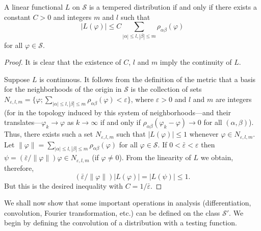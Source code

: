 \begin{theorem}\label{thm:c1-3-11}
A linear functional $L$ on $\mathscr{S}$ is a tempered distribution if and
only if there exists a constant $C > 0$ and integers $m$ and $l$ such that
\[
\left|L(\varphi)\right|\leq C\sum_{|\alpha|\leq l,|\beta|\leq m}\rho_{\alpha\beta}(\varphi)
\]
for all $\varphi \in \mathscr{S}$.
\end{theorem}

\begin{proof}
It is clear that the existence of $C$, $l$ and $m$ imply the continuity of $L$.

Suppose $L$ is continuous. It follows from the definition of the metric that a
basis for the neighborhoods of the origin in $\mathscr{S}$ is the collection
of sets
$N_{\varepsilon,l,m}=\{\varphi; \sum_{|\alpha|\leq l,|\beta|\leq m} \rho_{\alpha\beta}(\varphi) < \varepsilon\}$,
where $\varepsilon > 0$ and $l$ and $m$ are integers (for in the topology
induced by this system of neighborhoods---and their translates---$\varphi_{k} \to \varphi$
as $k \to \infty$ if and only if $\rho_{\alpha\beta}(\varphi_{k} - \varphi) \to 0$
for all $(\alpha, \beta)$). Thus, there exists such a set $N_{\varepsilon,l,m}$
such that $|L(\varphi)| \leq 1$ whenever $\varphi \in N_{\varepsilon,l,m}$. Let
$\|\varphi\| = \sum_{|\alpha|\leq l,|\beta|\leq m} \rho_{\alpha\beta}(\varphi)$
for all $\varphi \in \mathscr{S}$. If $0 < \bar{\varepsilon} < \varepsilon$
then $\psi = (\bar{\varepsilon}/\|\varphi\|)\varphi \in N_{\varepsilon,l,m}$
(if $\varphi \neq 0$). From the linearity of $L$ we obtain, therefore,
\[
(\bar{\varepsilon}/\|\varphi\|)|L(\varphi)|=|L(\psi)|\leq1.
\]
But this is the desired inequality with $C = 1/\bar{\varepsilon}$.
\end{proof}

We shall now show that some important operations in analysis
(differentiation, convolution, Fourier transformation, etc.) can be defined on
the class $\mathscr{S}'$. We begin by defining the convolution of a
distribution with a testing function.

